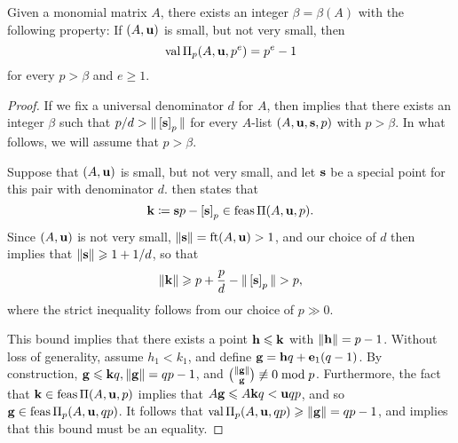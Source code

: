 \documentclass[11pt]{amsart}
\newcommand{\denom}{d}
\begin{document}

\begin{theorem}
   \label{small not very small value: T}
   Given a monomial matrix $A$, there exists an integer $\beta=\beta(A)$ with the following property\textup:
   If $(A, \mathbf{u})$ is small, but not very small, then  \[ \operatorname{val} \Pi_p(A, \mathbf{u}, p^e) = p^e-1\] for every $p > \beta$ and $e \geq 1$.
\end{theorem}

\begin{proof}
   If we fix a universal denominator $\denom$ for $A$, then  implies that there exists an integer $\beta$ such that $p/\denom > \norm{\tail{\vv{s}}_p}$ for every $A$-list $(A,\mathbf{u},\mathbf{s}, p)$ with $p > \beta$.
   In what follows, we will assume that $p > \beta$.

   Suppose that $(A,\mathbf{u})$ is small, but not very small, and let $\mathbf{s}$ be a special point for this pair with denominator $\denom$.
    then states that
   \[ \mathbf{k} \coloneqq \mathbf{s}p-\left[ \mathbf{s} \right]_p \in \operatorname{feas} \Pi(A,\mathbf{u},p). \]
   Since $(A,\mathbf{u})$ is not very small, $\| \mathbf{s} \| = \operatorname{ft}(A, \mathbf{u}) > 1$, and our choice of $\denom$ then implies that $\norm{\vv{s}} \geq 1 + 1/\denom$, so that
   \[\norm{\vv{k}} \geq p + \frac{p}\denom - \norm{\tail{\vv{s}}_p} > p,\]
   where the strict inequality follows from our choice of $p \gg 0$.

   This bound implies that there exists a point $\mathbf{h} \leqslant \mathbf{k}$ with $\| \mathbf{h} \| = p-1$.
   Without loss of generality, assume $h_1 < k_1$, and define $\mathbf{g} = \mathbf{h}q + \mathbf{e}_1(q-1)$.
   By construction, $\mathbf{g} \leqslant \mathbf{k}q, \| \mathbf{g} \| = qp-1$, and $\binom{\| \mathbf{g} \|}{\mathbf{g}} \not\equiv 0 \bmod p$.
   Furthermore, the fact that $\mathbf{k} \in \operatorname{feas} \Pi(A,\mathbf{u},p)$ implies that $A\mathbf{g} \leqslant A{\mathbf{k}}q < \mathbf{u}qp$, and so $\mathbf{g} \in \operatorname{feas} \Pi_p(A,\mathbf{u},qp)$.
   It follows that $\operatorname{val} \Pi_p(A,\mathbf{u},qp) \geqslant \| \mathbf{g} \| = qp-1$, and  implies that this bound must be an equality.
\end{proof} 
\end{document}
